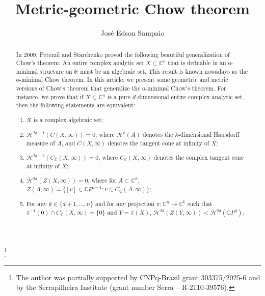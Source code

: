 \documentclass[a4paper,11pt]{amsart}
\begin{document}
\title[Metric-geometric Chow theorem]
{Metric-geometric Chow theorem}



\author[J. E. Sampaio]{Jos\'e Edson Sampaio}

\address{Jos\'e Edson Sampaio: Departamento de Matem\'atica, Universidade Federal do Cear\'a,
	      Rua Campus do Pici, s/n, Bloco 914, Pici, 60440-900, 
	      Fortaleza-CE, Brazil. \newline  
              E-mail: {\tt edsonsampaio@mat.ufc.br}
}





\thanks{
The author was partially supported by CNPq-Brazil grant 303375/2025-6 and by the Serrapilheira Institute (grant number Serra -- R-2110-39576).
}

\begin{abstract}
In 2009, Peterzil and Starchenko proved the following beautiful generalization of Chow's
theorem: An entire complex analytic set $X\subset \mathbb{C}^n$ that is definable in an o-minimal structure on $\mathbb{R}$ must be an algebraic set. This result is known nowadays as the o-minimal Chow theorem.
In this article, we present some geometric and metric versions of Chow's theorem that generalize the o-minimal Chow's theorem. For instance, we prove that if $X\subset \mathbb{C}^n$ is a pure $d$-dimensional entire complex analytic set, then the following statements are equivalent:
\begin{enumerate}
 \item $X$ is a complex algebraic set;
 \item $\mathcal{H}^{2d+1}(C(X,\infty))=0$, where $\mathcal{H}^{k}(A)$ denotes the $k$-dimensional Hausdorff measure of $A$, and $C(X,\infty)$ denotes the tangent cone at infinity of $X$;
 \item $\mathcal{H}^{2d+2}(C_{\mathbb{C}}(X,\infty))=0$, where $C_{\mathbb{C}}(X,\infty)$ denotes the complex tangent cone at infinity of $X$;
 \item $\mathcal{H}^{2d}(Z(X,\infty))=0$, where for $A\subset \mathbb{C}^k$, $Z(A,\infty)=\{[v]\in \mathbb{C}P^{k-1};v\in C_{\mathbb{C}}(A,\infty)\}$;
 \item For any $k\in\{d+1,...,n\}$ and for any projection $\pi\colon \mathbb{C}^{n}\to \mathbb{C}^{k}$ such that $\pi^{-1}(0)\cap C_{\mathbb{C}}(X,\infty)=\{0\}$ and $Y=\pi(X)$, $\mathcal{H}^{2d}(Z(Y,\infty))<\mathcal{H}^{2d}(\mathbb{C}P^{d})$.
\end{enumerate}

\end{abstract}
\end{document}
